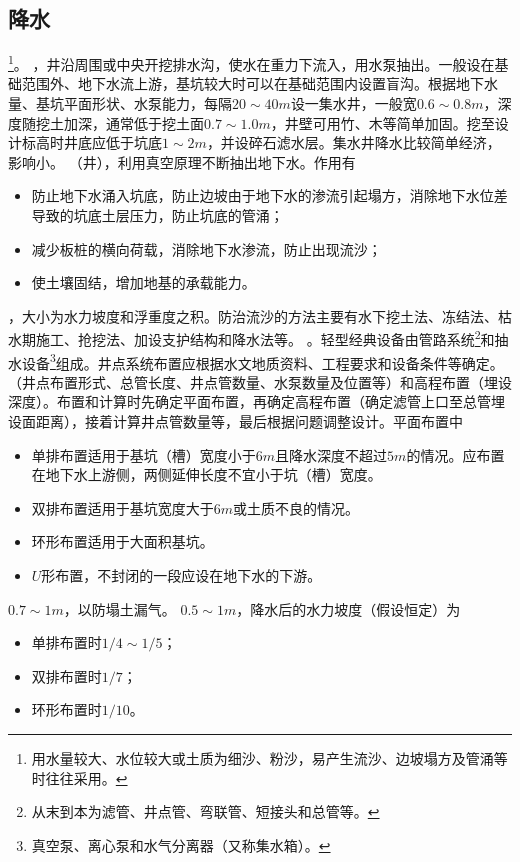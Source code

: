 \documentclass{book}
\begin{document}
\subsection{降水}
\footnote{用水量较大、水位较大或土质为细沙、粉沙，易产生流沙、边坡塌方及管涌等时往往采用。}。
，井沿周围或中央开挖排水沟，使水在重力下流入，用水泵抽出。一般设在基础范围外、地下水流上游，基坑较大时可以在基础范围内设置盲沟。根据地下水量、基坑平面形状、水泵能力，每隔$20\sim40m$设一集水井，一般宽$0.6\sim0.8m$，深度随挖土加深，通常低于挖土面$0.7\sim1.0m$，井壁可用竹、木等简单加固。挖至设计标高时井底应低于坑底$1\sim2m$，并设碎石滤水层。集水井降水比较简单经济，影响小。
（井），利用真空原理不断抽出地下水。作用有
\begin{itemize}
    \item 防止地下水涌入坑底，防止边坡由于地下水的渗流引起塌方，消除地下水位差导致的坑底土层压力，防止坑底的管涌；
    \item 减少板桩的横向荷载，消除地下水渗流，防止出现流沙；
    \item 使土壤固结，增加地基的承载能力。
\end{itemize}
，大小为水力坡度和浮重度之积。防治流沙的方法主要有水下挖土法、冻结法、枯水期施工、抢挖法、加设支护结构和降水法等。
。轻型经典设备由管路系统\footnote{从末到本为滤管、井点管、弯联管、短接头和总管等。}和抽水设备\footnote{真空泵、离心泵和水气分离器（又称集水箱）。}组成。井点系统布置应根据水文地质资料、工程要求和设备条件等确定。
（井点布置形式、总管长度、井点管数量、水泵数量及位置等）和高程布置（埋设深度）。布置和计算时先确定平面布置，再确定高程布置（确定滤管上口至总管埋设面距离），接着计算井点管数量等，最后根据问题调整设计。平面布置中
\begin{itemize}
    \item 单排布置适用于基坑（槽）宽度小于$6m$且降水深度不超过$5m$的情况。应布置在地下水上游侧，两侧延伸长度不宜小于坑（槽）宽度。
    \item 双排布置适用于基坑宽度大于$6m$或土质不良的情况。
    \item 环形布置适用于大面积基坑。
    \item $U$形布置，不封闭的一段应设在地下水的下游。
\end{itemize}
$0.7\sim1m$，以防塌土漏气。
$0.5\sim1m$，降水后的水力坡度（假设恒定）为
\begin{itemize}
    \item 单排布置时$1/4\sim1/5$；
    \item 双排布置时$1/7$；
    \item 环形布置时$1/10$。
\end{itemize}
\end{document}
